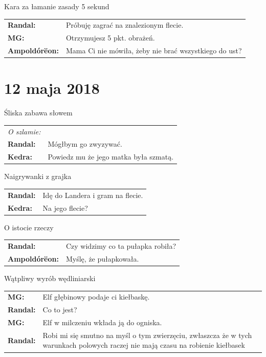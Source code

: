 \documentclass[10pt,twoside,twocolumn]{book}
\begin{document}
\begin{rpg-quotebox}{Kara za łamanie zasady 5 sekund}
   \begin{tabularx}{\columnwidth}{lX}
      \textbf{Randal:} & Próbuję zagrać na znalezionym flecie.\\
      \textbf{MG:} & Otrzymujesz 5 pkt. obrażeń.\\
      \textbf{Ampoldórëon:} & Mama Ci nie mówiła, żeby nie brać wszystkiego do ust?\\
   \end{tabularx}
\end{rpg-quotebox}


\section*{12 maja 2018}


\begin{rpg-quotebox}{Śliska zabawa słowem}
   \begin{tabularx}{\columnwidth}{lX}
      \textit{O szlamie:}\\
      \textbf{Randal:} & Mógłbym go zwyzywać.\\
      \textbf{Kedra:} & Powiedz mu że jego matka była szmatą.\\
   \end{tabularx}
\end{rpg-quotebox}


\begin{rpg-quotebox}{Naigrywanki z grajka}
   \begin{tabularx}{\columnwidth}{lX}
      \textbf{Randal:} & Idę do Landera i gram na flecie.\\
      \textbf{Kedra:} & Na jego flecie?\\
   \end{tabularx}
\end{rpg-quotebox}


\begin{rpg-quotebox}{O istocie rzeczy}
   \begin{tabularx}{\columnwidth}{lX}
      \textbf{Randal:} & Czy widzimy co ta pułapka robiła?\\
      \textbf{Ampoldórëon:} & Myślę, że pułapkowała.\\
   \end{tabularx}
\end{rpg-quotebox}


\begin{rpg-quotebox}{Wątpliwy wyrób wędliniarski}
   \begin{tabularx}{\columnwidth}{lX}
      \textbf{MG:} & Elf głębinowy podaje ci kiełbaskę.\\
      \textbf{Randal:} & Co to jest?\\
      \textbf{MG:} & Elf w milczeniu wkłada ją do ogniska.\\
      \textbf{Randal:} & Robi mi się smutno na myśl o tym zwierzęciu, zwłaszcza że w tych warunkach polowych raczej nie mają czasu na robienie kiełbasek\\
   \end{tabularx}
\end{rpg-quotebox}
\end{document}
